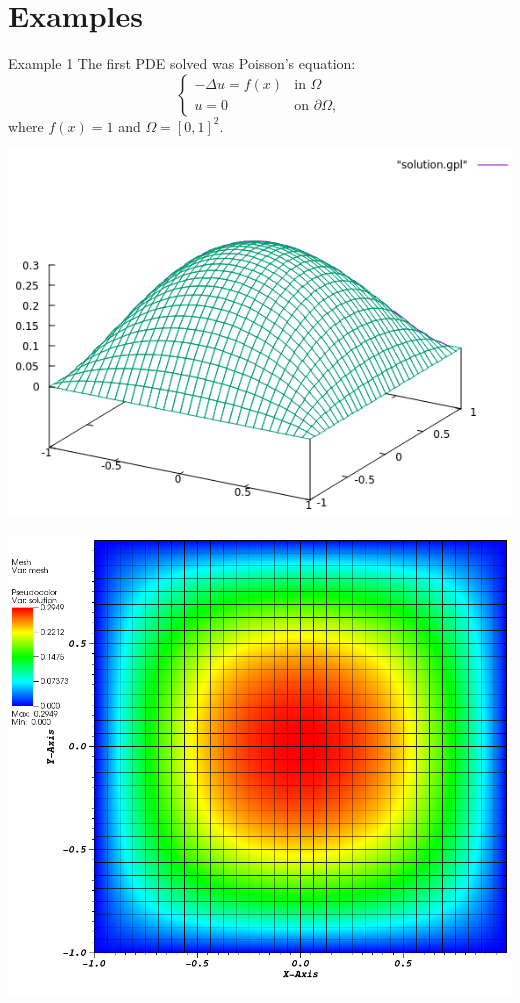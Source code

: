 \documentclass[9pt]{beamer}
\newcommand{\lap}{\Delta}
\begin{document}
\section{Examples}
\begin{frame}{Example 1}
	The first PDE solved was Poisson's equation:
	$$
		\begin{cases}
		-\lap u = f(x) &\text{in }\Omega\\
		u = 0 & \text{on }\partial\Omega,
		\end{cases}
	$$
	where $f(x) = 1$ and $\Omega = [0,1]^2$.
	
	\begin{minipage}{.5\paperwidth}
		\centering
		\includegraphics[scale=.39]{Solu1-gnuplot.png}
	\end{minipage}%
	\begin{minipage}{.4\paperwidth}
		\centering
		\includegraphics[scale=.7]{Solu1-visit.png}
	\end{minipage}
\end{frame}
\end{document}
